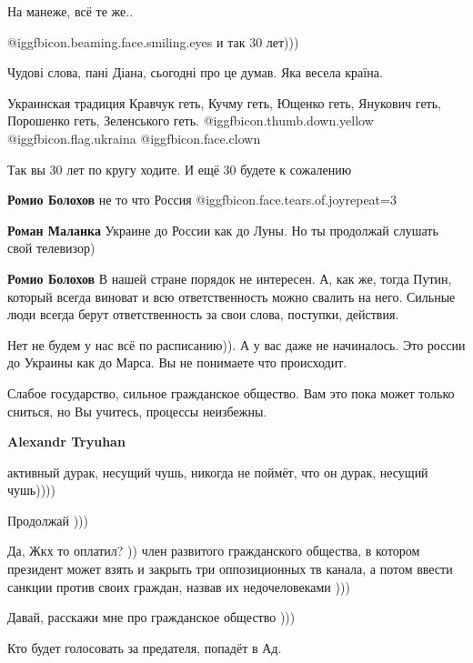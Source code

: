 \begin{itemize}
На манеже, всё те же..

 @igg{fbicon.beaming.face.smiling.eyes}  и так 30 лет)))

Чудові слова, пані Діана, сьогодні про це думав. Яка весела країна.


Украинская традиция Кравчук геть, Кучму геть, Ющенко геть, Янукович геть,
Порошенко геть, Зеленського геть. @igg{fbicon.thumb.down.yellow}
@igg{fbicon.flag.ukraina}  @igg{fbicon.face.clown} 


Так вы 30 лет по кругу ходите.
И ещё 30 будете к сожалению

\begin{itemize} %
\textbf{Ромио Болохов} не то что Россия  @igg{fbicon.face.tears.of.joy}{repeat=3} 

\textbf{Роман Маланка} Украине до России как до Луны. Но ты продолжай слушать свой телевизор)

\textbf{Ромио Болохов} В нашей стране порядок не интересен. А, как же, тогда Путин, который всегда виноват и всю ответственность можно свалить на него. Сильные люди всегда берут ответственность за свои слова, поступки, действия.


Нет не будем у нас всё по расписанию)). А у вас даже не начиналось. Это россии
до Украины как до Марса. Вы не понимаете что происходит.

Слабое государство, сильное гражданское общество. Вам это пока может только
сниться, но Вы учитесь, процессы неизбежны.

\textbf{Alexandr Tryuhan} 

активный дурак, несущий чушь, никогда не поймёт, что он дурак, несущий чушь))))

Продолжай )))

Да, Жкх то оплатил? )) член развитого гражданского общества, в котором
президент может взять и закрыть три оппозиционных тв канала, а потом ввести
санкции против своих граждан, назвав их недочеловеками )))

Давай, расскажи мне про гражданское общество )))

\end{itemize} %

Кто будет голосовать за предателя, попадёт в Ад.


\end{itemize}
